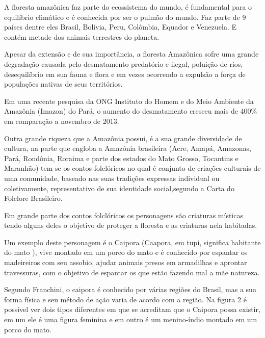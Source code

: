 A floresta amazônica faz parte do ecossistema do mundo, é fundamental para o equilíbrio climático e é conhecida por ser o pulmão do mundo. Faz parte de 9 países dentre eles Brasil, Bolívia, Peru, Colômbia, Equador e Venezuela. E contém metade dos animais terrestres do planeta.

Apesar da extensão e de sua importância, a floresta Amazônica sofre uma grande degradação causada pelo desmatamento predatório e ilegal, poluição de rios, desequilíbrio em sua fauna e flora e em vezes ocorrendo a expulsão a força de populações nativas de seus territórios.

Em uma recente pesquisa da ONG Instituto do Homem e do Meio Ambiente da Amazônia (Imazon) do Pará, o aumento do desmatamento cresceu mais de 400\% em comparação a novembro de 2013. \cite{des}

Outra grande riqueza que a Amazônia possui, é a sua grande diversidade de cultura, na parte que engloba a Amazônia brasileira (Acre, Amapá, Amazonas, Pará, Rondônia, Roraima e parte dos estados do Mato Grosso, Tocantins e Maranhão) tem-se os contos folclóricos no qual é conjunto de criações culturais de uma comunidade, baseado nas suas tradições expressas individual ou coletivamente, representativo de sua identidade social,segundo a Carta do Folclore Brasileiro.\cite{fc}

Em grande parte dos contos folclóricos os personagens são criaturas místicas tendo alguns deles o objetivo de proteger a floresta e as criaturas nela habitadas.


Um exemplo deste personagem é o Caipora (Caapora, em tupi, significa habitante do mato \cite{sig}), vive montado em um porco do mato e é conhecido por espantar os madeireiros com seu assobio, ajudar animais presos em armadilhas e aprontar travessuras, com o objetivo de espantar os que estão fazendo mal a mãe natureza. 

Segundo Franchini, o caipora é conhecido por várias regiões do Brasil, mas a sua forma física e seu método de ação varia de acordo com a região.
Na figura 2 é possível ver dois tipos diferentes em que se acreditam que o Caipora possa existir, em um ele é uma figura feminina e em outro é um menino-índio montado em um porco do mato. \cite{100}

\begin{figure}[h!]
		\centering
	\end{figure}
	
